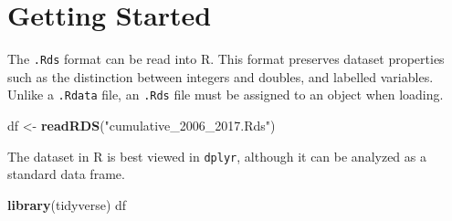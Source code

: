 \documentclass[10pt,article,oneside]{memoir}
\theoremstyle{definition}
\newenvironment{Shaded}{\begin{snugshade}}{\end{snugshade}}
\newcommand{\KeywordTok}[1]{\textcolor[rgb]{0.13,0.29,0.53}{\textbf{#1}}}
\newcommand{\NormalTok}[1]{#1}
\newcommand{\StringTok}[1]{\textcolor[rgb]{0.31,0.60,0.02}{#1}}
\begin{document}
\bigskip

\newpage

\hypertarget{getting-started}{%
\section{Getting Started}\label{getting-started}}

The \texttt{.Rds} format can be read into R. This format preserves
dataset properties such as the distinction between integers and doubles,
and labelled variables. Unlike a \texttt{.Rdata} file, an \texttt{.Rds}
file must be assigned to an object when loading.

\begin{Shaded}
\begin{Highlighting}[]
\NormalTok{df <-}\StringTok{ }\KeywordTok{readRDS}\NormalTok{(}\StringTok{"cumulative_2006_2017.Rds"}\NormalTok{)}
\end{Highlighting}
\end{Shaded}

The dataset in R is best viewed in \texttt{dplyr}, although it can be
analyzed as a standard data frame.

\begin{Shaded}
\begin{Highlighting}[]
\KeywordTok{library}\NormalTok{(tidyverse)}
\NormalTok{df}
\end{Highlighting}
\end{Shaded}
\end{document}

